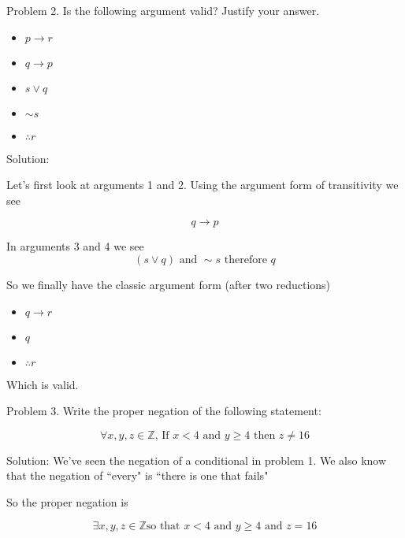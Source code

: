 \documentclass[16 pt]{amsart}
\theoremstyle{definition}
\theoremstyle{remark}
\numberwithin{equation}{subsection}
\newcommand{\Z}{\mathbb{Z}}
\begin{document}
\newpage
Problem 2. Is the following argument valid?  Justify your answer.\\


\begin{itemize}
\item[] $p\rightarrow r$\\
\item[] $q \rightarrow p $\\
\item[] $s \vee q$\\
\item[] $\sim s$
\item[] $\therefore r$
\end{itemize}


\vspace{1in}

Solution:

Let's first look at arguments 1 and 2.  Using the argument form of transitivity we see

\[
q\rightarrow p
\]

In arguments 3 and 4 we see
\[
(s\vee q) \text{ and } \sim s \text{ therefore } q
\]


So we finally have the classic argument form (after two reductions)

\begin{itemize}
\item[] $q\rightarrow r$\\
\item[] $q$\\
\item[] $\therefore r$
\end{itemize}

Which is valid.

\newpage

Problem 3. Write the proper negation of the following statement:

\[
\forall x,y,z\in\Z \text{, If } x < 4 \text{ and } y\ge 4 \text{ then } z \ne 16
\]

\vspace{1in}

Solution: We've seen the negation of a conditional in problem 1.  We also know that the negation of ``every" is ``there is one that fails"

So the proper negation is


\[
\exists x,y,z\in\Z \text{so that } x < 4 \text{ and } y\ge 4 \text{ and } z = 16
\]



\newpage
\end{document}
